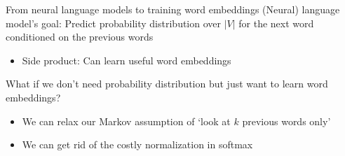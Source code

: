 \documentclass[12pt,aspectratio=169,handout]{beamer}
\begin{document}
\begin{frame}{From neural language models to training word embeddings}
(Neural) language model's goal: Predict probability distribution over $|V|$ for the next word conditioned on the previous words

\begin{itemize}
	\item Side product: Can learn useful word embeddings
\end{itemize}

\pause
What if we don't need probability distribution but just want to learn word embeddings?
\begin{itemize}
	\item We can relax our Markov assumption of `look at $k$ previous words only'
	\item We can get rid of the costly normalization in softmax
\end{itemize}
	
\end{frame}
\end{document}
